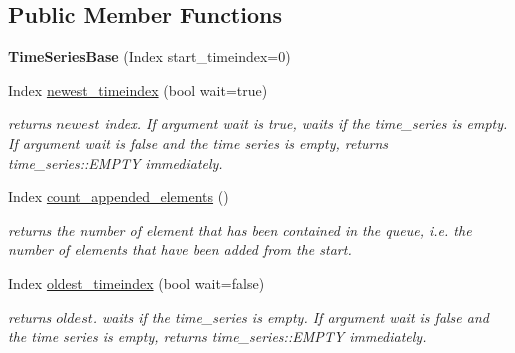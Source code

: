 \subsection*{Public Member Functions}
\begin{DoxyCompactItemize}
\item 
\mbox{\label{classtime__series_1_1internal_1_1TimeSeriesBase_a60aa9cdab364cd01a5f070bb75c187a3}} 
{\bfseries Time\+Series\+Base} (Index start\+\_\+timeindex=0)
\item 
\mbox{\label{classtime__series_1_1internal_1_1TimeSeriesBase_ae0a1c969dce12c09454451eb74f01983}} 
Index \hyperlink{classtime__series_1_1internal_1_1TimeSeriesBase_ae0a1c969dce12c09454451eb74f01983}{newest\+\_\+timeindex} (bool wait=true)
\begin{DoxyCompactList}\small\item\em returns $ newest $ index. If argument wait is true, waits if the time\+\_\+series is empty. If argument wait is false and the time series is empty, returns time\+\_\+series\+::\+E\+M\+P\+TY immediately. \end{DoxyCompactList}\item 
\mbox{\label{classtime__series_1_1internal_1_1TimeSeriesBase_a1e384606bee9664d05803f33235a0d60}} 
Index \hyperlink{classtime__series_1_1internal_1_1TimeSeriesBase_a1e384606bee9664d05803f33235a0d60}{count\+\_\+appended\+\_\+elements} ()
\begin{DoxyCompactList}\small\item\em returns the number of element that has been contained in the queue, i.\+e. the number of elements that have been added from the start. \end{DoxyCompactList}\item 
\mbox{\label{classtime__series_1_1internal_1_1TimeSeriesBase_a4e6a5b253566c71972a9470bb33c7d8a}} 
Index \hyperlink{classtime__series_1_1internal_1_1TimeSeriesBase_a4e6a5b253566c71972a9470bb33c7d8a}{oldest\+\_\+timeindex} (bool wait=false)
\begin{DoxyCompactList}\small\item\em returns $ oldest $. waits if the time\+\_\+series is empty. If argument wait is false and the time series is empty, returns time\+\_\+series\+::\+E\+M\+P\+TY immediately. \end{DoxyCompactList}\item 

\end{DoxyCompactItemize}
